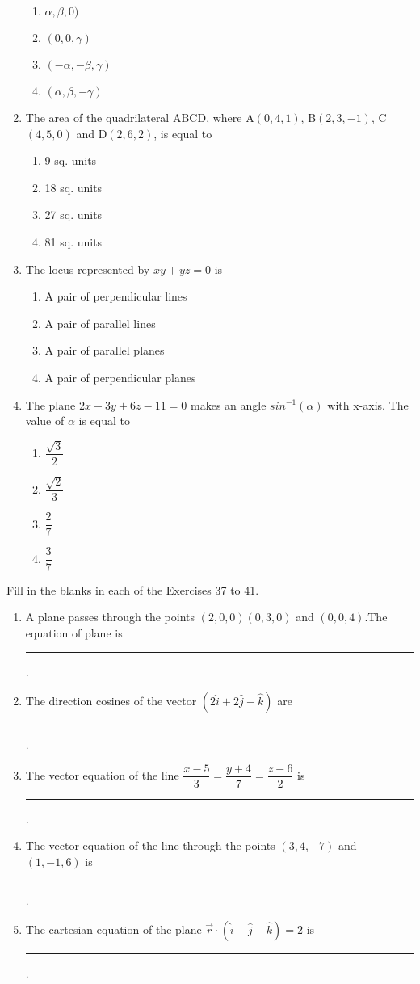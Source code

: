 \documentclass[12pt]{article}
\begin{document}
\begin{enumerate}[resume]
\begin{enumerate}[fourcol]
	\item $\alpha,\beta,0)$
	\item $(0,0,\gamma)$
	\item $(-\alpha,-\beta,\gamma)$
	\item $(\alpha,\beta,-\gamma)$
\end{enumerate}
\item The area of the quadrilateral ABCD, where A$(0,4,1)$, B$(2,3,-1)$, C$(4,5,0)$ and D$(2,6,2)$, is equal to 
\begin{enumerate}[fourcol]
	\item 9 sq. units
	\item 18 sq. units 
	\item 27 sq. units 
	\item 81 sq. units
\end{enumerate}
\item The locus represented by $xy+yz=0$ is 
\begin{enumerate}[twocol]
	\item A pair of perpendicular lines
	\item A pair of parallel lines
	\item A pair of parallel planes 
	\item A pair of perpendicular planes
\end{enumerate}
\item The plane $2x-3y+6z-11=0$ makes an angle $sin^{-1}(\alpha)$ with x-axis. The value of $\alpha$ is equal to 
\begin{enumerate}[fourcol]
	\item  $\dfrac{\sqrt{3}}{2}$
	\item  $\dfrac{\sqrt{2}}{3}$
	\item  $\dfrac{2}{7}$
	\item  $\dfrac{3}{7}$
\end{enumerate}
\end{enumerate}
Fill in the blanks in each of the Exercises 37 to 41.
\begin{enumerate}[resume]
\item A plane passes through the points $(2,0,0) (0,3,0)$ and $(0,0,4)$.The equation of plane is \noindent\rule{2cm}{0.4pt}.
\item The direction cosines of the vector $(2\hat{i}+2\hat{j}-\hat{k})$ are \noindent\rule{2cm}{0.4pt}.
\item The vector equation of the line $\dfrac{x-5}{3}=\dfrac{y+4}{7}=\dfrac{z-6}{2}$ is \noindent\rule{2cm}{0.4pt}. 
\item The vector equation of the line through the points $(3,4,-7)$ and $(1,-1,6)$ is \noindent\rule{2cm}{0.4pt}.
\item The cartesian equation of the plane $\overrightarrow{r} \cdot (\hat{i}+\hat{j}-\hat{k})=2$ is \noindent\rule{2cm}{0.4pt}.
\end{enumerate}
\end{document}
